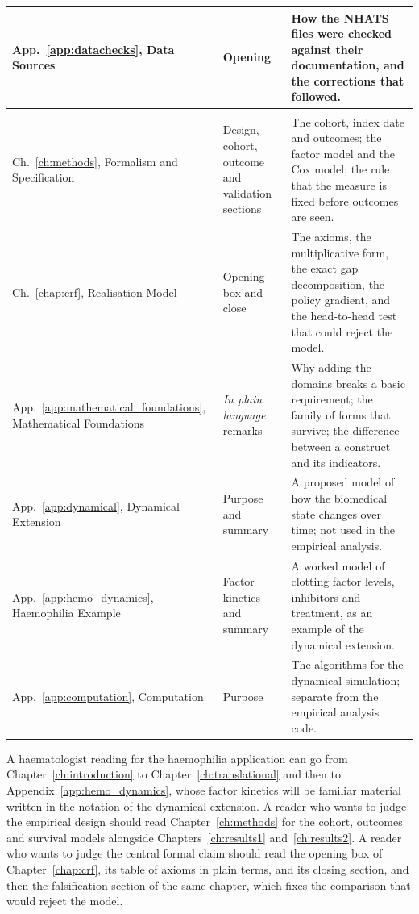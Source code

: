 \begin{table}[htbp]
\begin{tabular}{>{\raggedright\arraybackslash}p{3.3cm} >{\raggedright\arraybackslash}p{2.8cm} >{\raggedright\arraybackslash}p{8.6cm}}
App.~\ref{app:datachecks}, Data Sources & Opening & How the NHATS files were checked against their documentation, and the corrections that followed. \\
\midrule
\multicolumn{3}{l}{\textit{Mainly mathematical: read the plain-language passages}} \\
Ch.~\ref{ch:methods}, Formalism and Specification & Design, cohort, outcome and validation sections & The cohort, index date and outcomes; the factor model and the Cox model; the rule that the measure is fixed before outcomes are seen. \\
Ch.~\ref{chap:crf}, Realisation Model & Opening box and close & The axioms, the multiplicative form, the exact gap decomposition, the policy gradient, and the head-to-head test that could reject the model. \\
App.~\ref{app:mathematical_foundations}, Mathematical Foundations & \emph{In plain language} remarks & Why adding the domains breaks a basic requirement; the family of forms that survive; the difference between a construct and its indicators. \\
App.~\ref{app:dynamical}, Dynamical Extension & Purpose and summary & A proposed model of how the biomedical state changes over time; not used in the empirical analysis. \\
App.~\ref{app:hemo_dynamics}, Haemophilia Example & Factor kinetics and summary & A worked model of clotting factor levels, inhibitors and treatment, as an example of the dynamical extension. \\
App.~\ref{app:computation}, Computation & Purpose & The algorithms for the dynamical simulation; separate from the empirical analysis code. \\
\bottomrule
\end{tabular}
\end{table}

A haematologist reading for the haemophilia application can go from
Chapter~\ref{ch:introduction} to Chapter~\ref{ch:translational} and then to
Appendix~\ref{app:hemo_dynamics}, whose factor kinetics will be familiar
material written in the notation of the dynamical extension. A reader who
wants to judge the empirical design should read
Chapter~\ref{ch:methods} for the cohort, outcomes and survival models
alongside Chapters~\ref{ch:results1} and~\ref{ch:results2}. A reader who wants
to judge the central formal claim should read the opening box of
Chapter~\ref{chap:crf}, its table of axioms in plain terms, and its closing
section, and then the falsification section of the same chapter, which fixes
the comparison that would reject the model.

